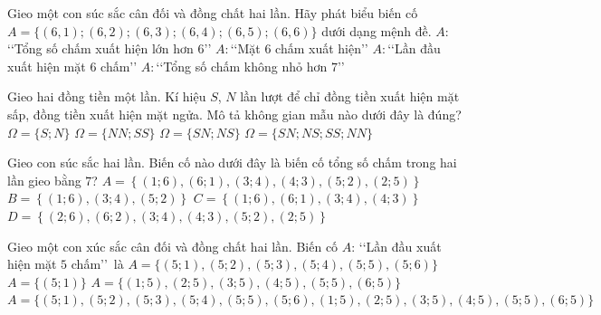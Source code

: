 

\begin{ex}%
	Gieo một con súc sắc cân đối và đồng chất hai lần. Hãy phát biểu biến cố $ A=\{(6, 1); (6, 2);  (6, 3); (6,4); (6, 5); (6, 6)\} $ dưới dạng mệnh đề.
	 \choice
		{$  A\colon$\lq\lq Tổng số chấm xuất hiện lớn hơn $ 6 $\rq\rq}
		{$ A\colon$\lq\lq Mặt $ 6 $ chấm  xuất hiện\rq\rq}
		{\True $ A\colon$\lq\lq Lần đầu xuất  hiện mặt $ 6 $ chấm\rq\rq}
		{$ A\colon$\lq\lq Tổng số chấm không nhỏ hơn $ 7  $\rq\rq}
\end{ex}

\begin{ex}%
	Gieo hai đồng tiền một lần. Kí hiệu $S$, $N$ lần lượt để chỉ đồng tiền xuất hiện mặt sấp,  đồng tiền xuất hiện mặt ngửa. Mô tả không gian mẫu nào dưới đây là đúng?
	\choice 
		{$\Omega=\{S;  N\}$}
		{$\Omega=\{NN; SS\}$} 
		{$\Omega=\{SN; NS\}$} 
		{\True  $\Omega=\{SN; NS; SS; NN\}$}
\end{ex}

\begin{ex}%
	Gieo con súc sắc hai lần. Biến cố nào dưới  đây là biến cố tổng số chấm trong hai lần gieo bằng $7$?
	\choice 
		{\True $A = \left\lbrace (1;6), (6;1), (3;4), (4;3), (5;2),  (2;5)\right\rbrace $}
		 {$B = \left\lbrace (1;6), (3;4), (5;2)\right\rbrace $}
		 {$C = \left\lbrace (1;6), (6;1), (3;4), (4;3)\right\rbrace $}
		{$D = \left\lbrace (2;6), (6;2), (3;4),  (4;3), (5;2), (2;5)\right\rbrace $}
\end{ex}

\begin{ex}%
	Gieo một con  xúc sắc cân đối và đồng chất hai lần. Biến cố $A$: \lq\lq Lần đầu xuất hiện mặt $5$ chấm\rq\rq\ là
	 \choice
		{\True  $A=\{(5;1),(5;2),(5;3),(5;4),(5;5),(5;6)\}$}
		 {$A=\{(5;1)\}$}
		 {$A=\{(1;5),(2;5),(3;5),(4;5),(5;5),(6;5)\}$}
		{$A=\{(5;1),(5;2),(5;3),(5;4),(5;5),(5;6),(1;5),(2;5),(3;5),(4;5),(5;5),(6;5)\}$} 
\end{ex}

